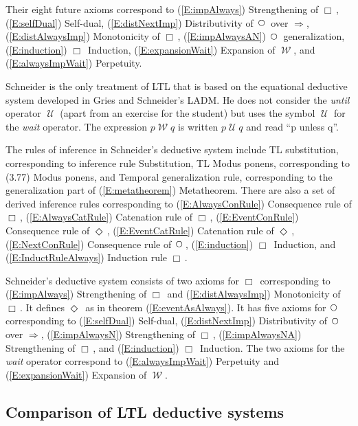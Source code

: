 \documentclass[12pt, fleqn, leqno]{article}
\newcommand{\impl}{\ensuremath{\Rightarrow}}        %
\newcommand{\Until}{\;\mathcal{U}\;}
\newcommand{\Wait}{\;\mathcal{W}\;}
\newcommand{\Next}{\;\,\text{\raisebox{3.5pt}{\circle{6}}}}
\newcommand{\Event}{\Diamond\,}
\newcommand{\Always}{\Box\,}
\begin{document}
Their eight future axioms correspond to (\ref{E:impAlways}) Strengthening of $\Always$, (\ref{E:selfDual}) Self-dual, (\ref{E:distNextImp}) Distributivity of $\Next$ over $\impl$, (\ref{E:distAlwaysImp}) Monotonicity of $\Always$, (\ref{E:impAlwaysAN}) $\Next$ generalization, (\ref{E:induction}) $\Always$ Induction, (\ref{E:expansionWait}) Expansion of $\Wait$, and (\ref{E:alwaysImpWait}) Perpetuity.

Schneider \cite{Schn} is the only treatment of LTL that is based on the equational deductive system developed in Gries and Schneider's LADM. \cite{LADM}
He does not consider the \textit{until} operator $\Until$ (apart from an exercise for the student) but uses the symbol $\Until$ for the \textit{wait} operator.
The expression $p\Wait q$ is written $p\Until q$ and read ``p unless q''.

The rules of inference in Schneider's deductive system include TL substitution, corresponding to inference rule Substitution, TL Modus ponens, corresponding to (3.77) Modus ponens, and Temporal generalization rule, corresponding to the generalization part of (\ref{E:metatheorem}) Metatheorem.
There are also a set of derived inference rules corresponding to (\ref{E:AlwaysConRule}) Consequence rule of $\Always$, (\ref{E:AlwaysCatRule}) Catenation rule of $\Always$, (\ref{E:EventConRule}) Consequence rule of $\Event$, (\ref{E:EventCatRule}) Catenation rule of $\Event$, (\ref{E:NextConRule}) Consequence rule of $\Next$, (\ref{E:induction}) $\Always$ Induction, and (\ref{E:InductRuleAlways}) Induction rule $\Always$.

Schneider's deductive system consists of two axioms for $\Always$ corresponding to (\ref{E:impAlways}) Strengthening of $\Always$ and (\ref{E:distAlwaysImp}) Monotonicity of $\Always$.
It defines $\Event$ as in theorem (\ref{E:eventAsAlways}).
It has five axioms for $\Next$ corresponding to (\ref{E:selfDual}) Self-dual, (\ref{E:distNextImp}) Distributivity of $\Next$ over $\impl$, (\ref{E:impAlwaysN}) Strengthening of $\Always$, (\ref{E:impAlwaysNA}) Strengthening of $\Always$, and (\ref{E:induction}) $\Always$ Induction.
The two axioms for the \textit{wait} operator correspond to (\ref{E:alwaysImpWait}) Perpetuity and (\ref{E:expansionWait}) Expansion of $\Wait$.

\subsection{Comparison of LTL deductive systems}\label{section-comparison}
\end{document}
